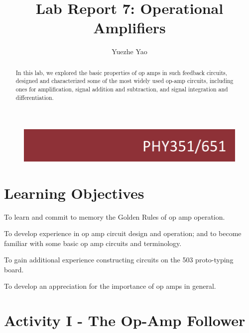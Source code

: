 \documentclass[11pt]{article}
\begin{document}
\begin{figure}
  \includegraphics[width=\linewidth/3]{title}
  \label{fig:title}
\end{figure}


\title{Lab Report 7: Operational Amplifiers}


\author{Yuezhe Yao}




\maketitle

\begin{abstract}
In this lab, we explored the basic properties of op amps in such feedback circuits, designed and characterized some of the most widely used op-amp circuits, including ones for amplification, signal addition and subtraction, and signal integration and differentiation.  
\end{abstract}

\medskip

\begingroup
\let\clearpage\relax
\tableofcontents
\endgroup

\medskip
\medskip

\section{Learning Objectives}

To learn and commit to memory the Golden Rules of op amp operation.

To develop experience in op amp circuit design and operation; and to become familiar with some basic op amp circuits and terminology.

To gain additional experience constructing circuits on the 503 proto-typing board.

To develop an appreciation for the importance of op amps in general.

\section{Activity I - The Op-Amp Follower}
\end{document}

